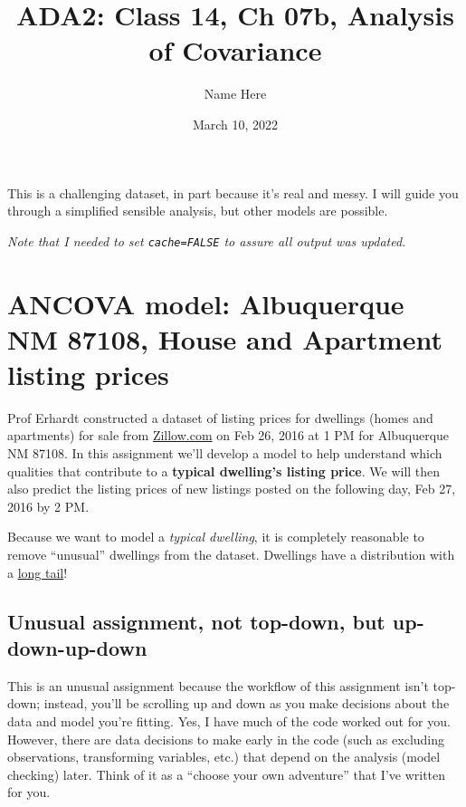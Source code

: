 \documentclass[
  12pt,
]{article}
\title{ADA2: Class 14, Ch 07b, Analysis of Covariance}
\author{Name Here}
\date{March 10, 2022}
\begin{document}
\maketitle

This is a challenging dataset, in part because it's real and messy. I
will guide you through a simplified sensible analysis, but other models
are possible.

\emph{Note that I needed to set \texttt{cache=FALSE} to assure all
output was updated.}

\hypertarget{ancova-model-albuquerque-nm-87108-house-and-apartment-listing-prices}{%
\section{ANCOVA model: Albuquerque NM 87108, House and Apartment listing
prices}\label{ancova-model-albuquerque-nm-87108-house-and-apartment-listing-prices}}

Prof Erhardt constructed a dataset of listing prices for dwellings
(homes and apartments) for sale from
\href{http://www.zillow.com/homes/for_sale/Albuquerque-NM-87108/95303_rid/any_days/35.095087-106.52167835.035021-106.633258_rect/13_zm/0_mmm/}{Zillow.com}
on Feb 26, 2016 at 1 PM for Albuquerque NM 87108. In this assignment
we'll develop a model to help understand which qualities that contribute
to a \textbf{typical dwelling's listing price}. We will then also
predict the listing prices of new listings posted on the following day,
Feb 27, 2016 by 2 PM.

Because we want to model a \emph{typical dwelling}, it is completely
reasonable to remove ``unusual'' dwellings from the dataset. Dwellings
have a distribution with a
\href{https://en.wikipedia.org/wiki/Long_tail}{long tail}!

\hypertarget{unusual-assignment-not-top-down-but-up-down-up-down}{%
\subsection{Unusual assignment, not top-down, but
up-down-up-down}\label{unusual-assignment-not-top-down-but-up-down-up-down}}

This is an unusual assignment because the workflow of this assignment
isn't top-down; instead, you'll be scrolling up and down as you make
decisions about the data and model you're fitting. Yes, I have much of
the code worked out for you. However, there are data decisions to make
early in the code (such as excluding observations, transforming
variables, etc.) that depend on the analysis (model checking) later.
Think of it as a ``choose your own adventure'' that I've written for
you.
\end{document}
